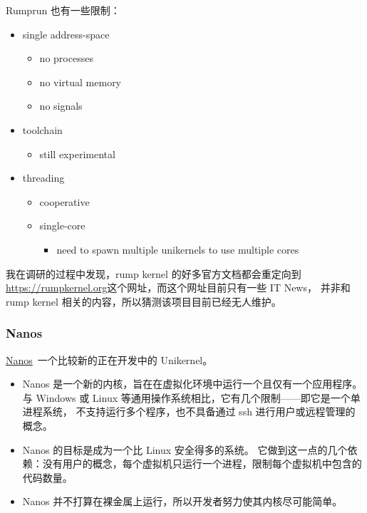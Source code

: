 \documentclass{../runikraft-report}
\begin{document}
Rumprun 也有一些限制：

\begin{itemize}
\item single address-space
    \begin{itemize}
    \item no processes
    \item no virtual memory
    \item no signals
    \end{itemize}
\item toolchain
    \begin{itemize}
    \item still experimental
    \end{itemize}
\item threading
    \begin{itemize}
    \item cooperative
    \item single-core
        \begin{itemize}
        \item need to spawn multiple unikernels to use multiple cores
        \end{itemize}
    \end{itemize}
\end{itemize}

我在调研的过程中发现，rump kernel 的好多官方文档都会重定向到
\url{https://rumpkernel.org}这个网址，而这个网址目前只有一些 IT News，
并非和 rump kernel 相关的内容，所以猜测该项目目前已经无人维护。

\subsubsection{Nanos}

\href{https://github.com/nanovms/nanos}{Nanos}\ 一个比较新的正在开发中的 Unikernel。

\begin{itemize}
\item Nanos 是一个新的内核，旨在在虚拟化环境中运行一个且仅有一个应用程序。
与 Windows 或 Linux 等通用操作系统相比，它有几个限制——即它是一个单进程系统，
不支持运行多个程序，也不具备通过 ssh 进行用户或远程管理的概念。
\item Nanos 的目标是成为一个比 Linux 安全得多的系统。
它做到这一点的几个依赖：没有用户的概念，每个虚拟机只运行一个进程，限制每个虚拟机中包含的代码数量。
\item Nanos 并不打算在裸金属上运行，所以开发者努力使其内核尽可能简单。
\end{itemize}
\end{document}
